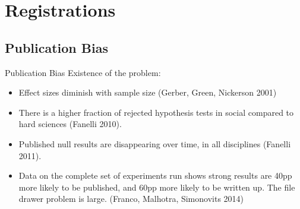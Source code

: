 \documentclass{beamer}
\begin{document}
{ %
    \begin{frame}[plain]
     \end{frame}
}
\section{Registrations}

\subsection*{Publication Bias}
\begin{frame}{Publication Bias}%
  Existence of the problem:
  \begin{itemize}[<.->]
  \item
 Effect sizes diminish with sample size (Gerber, Green, Nickerson 2001)
  \item
  There is a higher fraction of rejected hypothesis tests in social compared to hard sciences (Fanelli 2010).
  \item
  	Published null results are disappearing over time, in all disciplines (Fanelli 2011). 
  \item
  	Data on the complete set of experiments run shows strong results are 40pp more likely to be published, and 60pp more likely to be written up. The file drawer problem is large. (Franco, Malhotra, Simonovits 2014)
  \end{itemize}
\end{frame}
\end{document}
